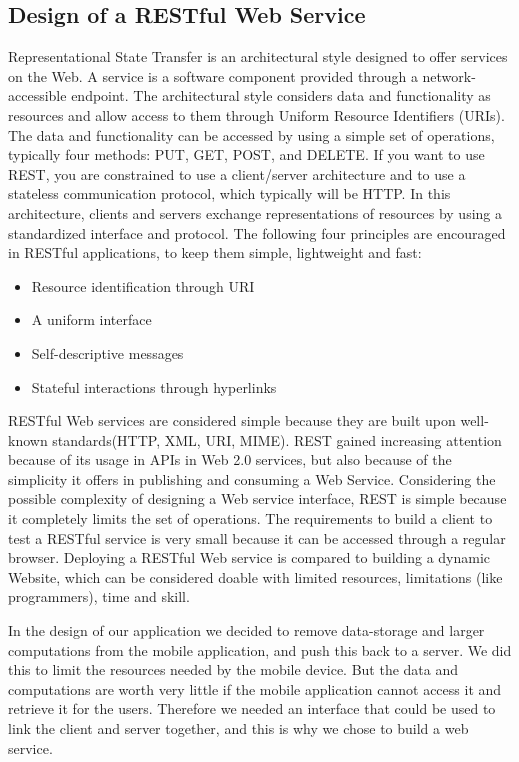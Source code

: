 \subsection{Design of a RESTful Web Service}
\label{subsec:restDes}

Representational State Transfer is an architectural style designed to offer services on the Web. A service is a software component provided through a network-accessible endpoint. The architectural style considers data and functionality as resources and allow access to them through Uniform Resource Identifiers (URIs). The data and functionality can be accessed by using a simple set of operations, typically four methods: PUT, GET, POST, and DELETE. If you want to use REST, you are constrained to use a client/server architecture and to use a stateless communication protocol, which typically will be HTTP. In this architecture, clients and servers exchange representations of resources by using a standardized interface and protocol. The following four principles are encouraged in RESTful applications, to keep them simple, lightweight and fast\cite{WhatIsRESTful}\cite{DecidingOnRESTful}:

\begin{itemize}
\item Resource identification through URI
\item A uniform interface
\item Self-descriptive messages
\item Stateful interactions through hyperlinks
\end{itemize}

RESTful Web services are considered simple because they are built upon well-known standards(HTTP, XML, URI, MIME). REST gained increasing attention because of its usage in APIs in Web 2.0 services, but also because of the simplicity it offers in publishing and consuming a Web Service. Considering the possible complexity of designing a Web service interface, REST is simple because it completely limits the set of operations. The requirements to build a client to test a RESTful service is very small because it can be accessed through a regular browser. Deploying a RESTful Web service is compared to building a dynamic Website, which can be considered doable with limited resources, limitations (like programmers), time and skill. \cite{DecidingOnRESTful}

In the design of our application we decided to remove data-storage and larger computations from the mobile application, and push this back to a server. We did this to limit the resources needed by the mobile device. But the data and computations are worth very little if the mobile application cannot access it and retrieve it for the users. Therefore we needed an interface that could be used to link the client and server together, and this is why we chose to build a web service.

